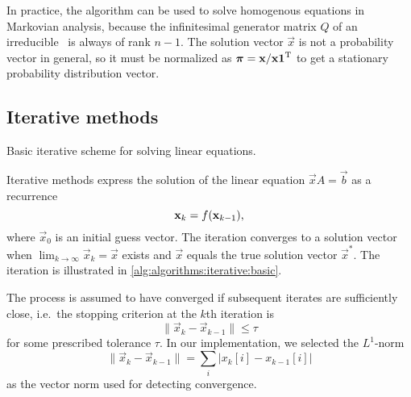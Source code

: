In practice, the algorithm can be used to solve homogenous equations
in Markovian analysis, because the infinitesimal generator matrix $Q$
of an irreducible \CTMC\ is always of rank $n - 1$. The solution
vector $\vec{x}$ is not a probability vector in general, so it must be
normalized as $\vec{\pi} = \vec{x} / \vec{x} \vec{1}^\T$ to get a
stationary probability distribution vector.

\subsection{Iterative methods}

\begin{algorithm}
  \;
  \caption{Basic iterative scheme for solving linear equations.}
  \label{alg:algorithms:iterative:basic}
\end{algorithm}

Iterative methods express the solution of the linear equation $\vec{x}
A = \vec{b}$ as a recurrence
\begin{equation}
  \vec{x}_{k} = f(\vec{x}_{k - 1}) \text,
\end{equation}
where $\vec{x}_0$ is an initial guess vector. The iteration converges
to a solution vector when $\lim_{k \to \infty} \vec{x}_k = \vec{x}$
exists and $\vec{x}$ equals the true solution vector $\vec{x}^*$. The
iteration is illustrated in \cref{alg:algorithms:iterative:basic}.

The process is assumed to have converged if subsequent iterates are
sufficiently close, i.e.~the stopping criterion at the $k$th iteration
is
\begin{equation}
  \label{eq:algorithms:iterative:convergence}
  \| \vec{x}_{k} - \vec{x}_{k - 1} \| \le \tau
\end{equation}
for some prescribed tolerance $\tau$. In our implementation, we
selected the $L^1$-norm
\begin{equation}
  \| \vec{x}_{k} - \vec{x}_{k - 1} \| = \sum_{i} \bigl\lvert x_{k}[i] - x_{k -
    1}[i] \bigr\rvert
\end{equation}
as the vector norm used for detecting convergence.

